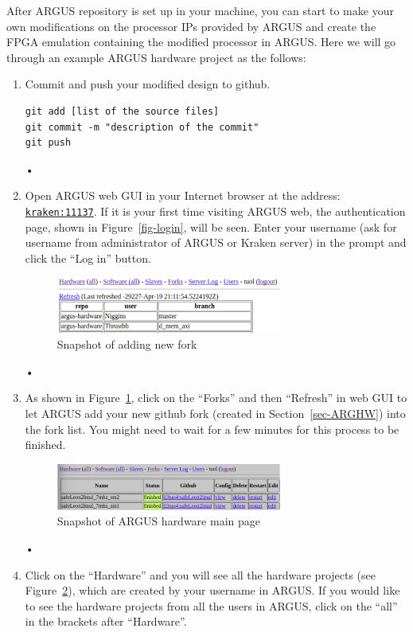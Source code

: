 \documentclass[a4paper,10pt]{article}
\begin{document}
After ARGUS repository is set up in your machine, you can start to make your own modifications on the processor IPs provided by ARGUS and create the FPGA emulation containing the modified processor in ARGUS. Here we will go through an example ARGUS hardware project as the follows:
\begin{enumerate}
\item Commit and push your modified design to github.
\begin{verbatim}
git add [list of the source files]
git commit -m "description of the commit"
git push
\end{verbatim}•
\item Open ARGUS web GUI in your Internet browser at the address: \texttt{\url{kraken:11137}}. If it is your first time visiting ARGUS web, the authentication page, shown in Figure~\ref{fig-login}, will be seen. Enter your username (ask for username from administrator of ARGUS or Kraken server) in the prompt and click the ``Log in'' button.
\begin{figure}[h]
\centering
\includegraphics[width=0.7\textwidth]{fig/fork.eps}
\caption{Snapshot of adding new fork}\label{fig-fork}
\end{figure}•
\item As shown in Figure~\ref{fig-fork}, click on the ``Forks'' and then ``Refresh'' in web GUI to let ARGUS add your new github fork (created in Section~\ref{sec-ARGHW}) into the fork list. You might need to wait for a few minutes for this process to be finished.
\begin{figure}[h]
\centering
\includegraphics[width=0.7\textwidth]{fig/hwmain.eps}
\caption{Snapshot of ARGUS hardware main page}\label{fig-hwmain}
\end{figure}•
\item Click on the ``Hardware'' and you will see all the hardware projects (see Figure~\ref{fig-hwmain}), which are created by your username in ARGUS. If you would like to see the hardware projects from all the users in ARGUS, click on the ``all'' in the brackets after ``Hardware''. 

\end{enumerate}
\end{document}
